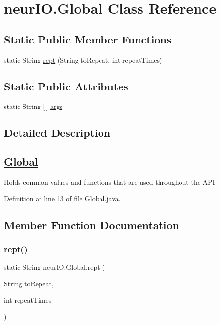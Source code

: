 \hypertarget{classneur_i_o_1_1_global}{}\section{neur\+I\+O.\+Global Class Reference}
\label{classneur_i_o_1_1_global}
\subsection*{Static Public Member Functions}
\begin{DoxyCompactItemize}
\item 
static String \hyperlink{classneur_i_o_1_1_global_a37771c58148bb2d133618814f8267e6c}{rept} (String to\+Repeat, int repeat\+Times)
\end{DoxyCompactItemize}
\subsection*{Static Public Attributes}
\begin{DoxyCompactItemize}
\item 
static String \mbox{[}$\,$\mbox{]} \hyperlink{classneur_i_o_1_1_global_a3c6209cd45e77078a54b91b9a4f4f677}{args}
\end{DoxyCompactItemize}


\subsection{Detailed Description}
\subsection*{\hyperlink{classneur_i_o_1_1_global}{Global} }

Holds common values and functions that are used throughout the A\+PI 

Definition at line 13 of file Global.\+java.



\subsection{Member Function Documentation}
\mbox{\label{classneur_i_o_1_1_global_a37771c58148bb2d133618814f8267e6c}} 
\subsubsection{\texorpdfstring{rept()}{rept()}}
{\footnotesize\ttfamily static String neur\+I\+O.\+Global.\+rept (\begin{DoxyParamCaption}\item[{String}]{to\+Repeat,  }\item[{int}]{repeat\+Times }\end{DoxyParamCaption})\hspace{0.3cm}{\ttfamily [static]}}



